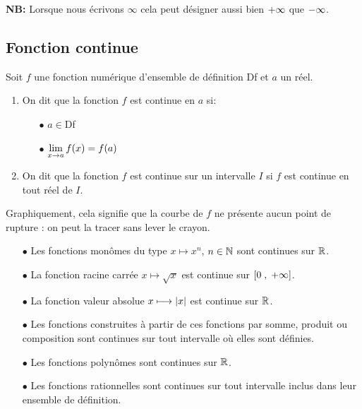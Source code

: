 


  
 

\textbf{NB:}\;   Lorsque nous écrivons $ \infty $ cela peut désigner aussi bien $+\infty $ que  $-\infty $.
\subsection{Fonction continue}

\begin{definition}
Soit  $ f $  une  fonction numérique d'ensemble de définition Df et $ a $ un réel.
\begin{enumerate}
 \item On dit que la fonction $ f $    est continue en  $ a $  si: 
 \begin{itemize}
 \item[$  \bullet$]  $ a\in $Df
 \item[$  \bullet$] $ \displaystyle \lim_{x\to a}f(x)=f(a) $
\end{itemize}
 \item On dit que la fonction $ f $    est continue sur un intervalle $ I $  si $ f $  est continue en tout réel de $ I $.
\end{enumerate}
Graphiquement, cela signifie que la courbe  de  $ f $ ne présente aucun point de rupture : on
peut la tracer sans lever le crayon.
\end{definition}

\begin{corollary}

\begin{itemize}
\item[$  \bullet$] Les fonctions  monômes  du type \; $ x\longmapsto x^{n} $,\; $ n\in\mathbb{N} $  sont continues sur $ \mathbb{R} $.
\item[$  \bullet$] La  fonction  racine carrée $ x\longmapsto \sqrt{x} $  est continue sur $ \left[0\;,\; +\infty\right] $.
\item[$  \bullet$] La fonction valeur absolue $ x\longmapsto \left\lvert x \right\rvert $ est continue sur $ \mathbb{R} $.
\item[$  \bullet$] Les fonctions  construites à partir de ces fonctions  par somme, produit ou composition sont continues sur tout intervalle où  elles sont définies.
\end{itemize}

\end{corollary}
 

 \begin{example}
\begin{itemize}
\item[$  \bullet$] Les fonctions polynômes sont continues sur $ \mathbb{R} $.
\item[$  \bullet$] Les fonctions  rationnelles sont continues sur tout intervalle  inclus dans leur ensemble de définition.
\end{itemize}

\end{example}


